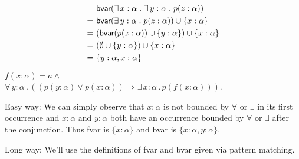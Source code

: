 \documentclass[11pt,fleqn]{article}
\newcommand{\mname}[1]{\mbox{\sf #1}}
\renewcommand{\And}{\wedge}
\newcommand{\And}{\wedge}
\newcommand{\Or}{\vee}
\newcommand{\Implies}{\Rightarrow}
\newcommand{\ForallApp}{\forall\,}
\newcommand{\ForsomeApp}{\exists\,}
\newcommand{\mdot}{\mathrel.}
\begin{document}
	\begin{align*}
		& \mname{bvar}(\ForsomeApp x : \alpha \mdot \ForsomeApp y : \alpha \mdot p(z:\alpha)) \\
		=~ & \mname{bvar}(\ForsomeApp y : \alpha \mdot p(z:\alpha)) \cup \{x : \alpha\} \\
		=~ & (\mname{bvar}(p(z:\alpha)) \cup \{y : \alpha\}) \cup \{x : \alpha\} \\
		=~ & (\emptyset \cup \{y : \alpha\}) \cup \{x : \alpha\} \\
		=~ & \{y : \alpha, x : \alpha\}
	\end{align*}
	
    \item $f(x:\alpha) = a \And {}$\\
      $\ForallApp y : \alpha \mdot
      ((p(y:\alpha) \Or p(x:\alpha)) \Implies \ForsomeApp x :
      \alpha \mdot p(f(x:\alpha)))$.
      
      Easy way: We can simply observe that $x:\alpha$ is not bounded by $\forall$ or $\exists$ in its first occurrence and $x:\alpha$ and $y:\alpha$ both have an occurrence bounded by $\forall$ or $\exists$ after the conjunction.
      Thus \mname{fvar} is $\{x:\alpha\}$ and \mname{bvar} is $\{x:\alpha, y:\alpha\}$.
      
      \medskip
      
      Long way:
      We'll use the definitions of \mname{fvar} and \mname{bvar} given via pattern matching.\\
      
\end{document}
